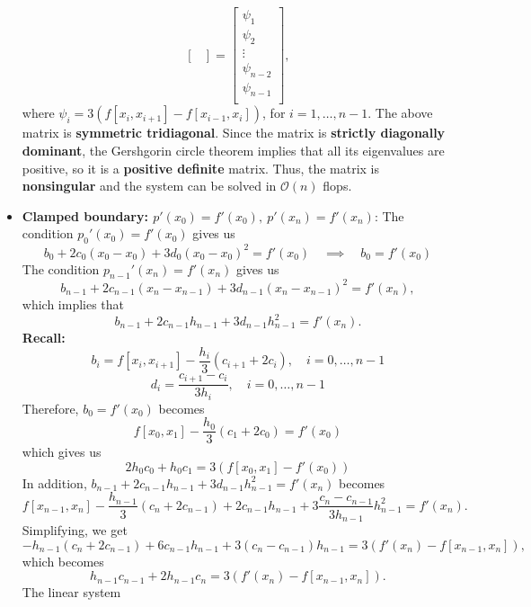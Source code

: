 \documentclass{report}
\begin{document}
\begin{itemize}
$$\begin{bmatrix}
            \end{bmatrix}
            = 
            \begin{bmatrix}
                \psi_1\\\psi_2\\\vdots\\\psi_{n-2}\\\psi_{n-1}\\
            \end{bmatrix},
            $$
            where $\psi_i = 3\left(f[x_i,x_{i+1}] - f[x_{i-1},x_{i}]\right)$, for $i = 1,\ldots,n-1$.
            \bigbreak \noindent 
            The above matrix is \textbf{symmetric tridiagonal}.
            \bigbreak \noindent 
            Since the matrix is \textbf{strictly diagonally dominant}, the Gershgorin circle theorem implies that all its eigenvalues are positive, so it is a \textbf{positive definite} matrix. 
            \bigbreak \noindent 
            Thus, the matrix is \textbf{nonsingular} and the system can be solved in $\mathcal{O}(n)$ flops.
        \item \textbf{Clamped boundary: $p'(x_0) = f'(x_0), \ p'(x_n) = f'(x_n)$}:
            The condition $p_0'(x_0) = f'(x_0)$ gives us 
            $$b_0 + 2c_0(x_0-x_0) + 3d_0(x_0-x_0)^2 = f'(x_0) \quad \implies \quad b_0 = f'(x_0)$$
            The condition $p_{n-1}'(x_n) = f'(x_n)$ gives us
            $$b_{n-1} + 2c_{n-1}(x_n-x_{n-1}) + 3d_{n-1}(x_n-x_{n-1})^2 = f'(x_n),$$
            which implies that
            $$b_{n-1} + 2c_{n-1}h_{n-1} + 3d_{n-1}h_{n-1}^2 = f'(x_n).$$
            \bigbreak \noindent 
            \textbf{Recall:} 
            $$b_i = f[x_i,x_{i+1}] - \displaystyle{\frac{h_i}{3}}(c_{i+1} + 2c_i), \quad i=0,\ldots,n-1$$
            $$d_i = \displaystyle{\frac{c_{i+1} - c_i}{3 h_i}}, \quad i=0,\ldots,n-1$$
            Therefore, $b_0 = f'(x_0)$ becomes
            $$f[x_0,x_1] - \frac{h_0}{3}(c_1 + 2c_0) = f'(x_0)$$
            which gives us
            $$2h_0 c_0 + h_0 c_1 = 3\left(f[x_0,x_1] - f'(x_0)\right)$$
            In addition, $b_{n-1} + 2c_{n-1}h_{n-1} + 3d_{n-1}h_{n-1}^2 = f'(x_n)$ becomes
            $$f[x_{n-1},x_n] - \frac{h_{n-1}}{3}(c_n + 2c_{n-1}) + 2c_{n-1}h_{n-1} + 3\frac{c_n - c_{n-1}}{3h_{n-1}}h_{n-1}^2 = f'(x_n).$$
            Simplifying, we get
            $$ - h_{n-1}(c_n + 2c_{n-1}) + 6c_{n-1}h_{n-1} + 3(c_n - c_{n-1})h_{n-1} = 3\left(f'(x_n) - f[x_{n-1},x_n]\right),$$
            which becomes
            $$h_{n-1} c_{n-1} + 2 h_{n-1} c_n = 3\left(f'(x_n) - f[x_{n-1},x_n]\right).$$
            The linear system 

\end{itemize}
\end{document}
